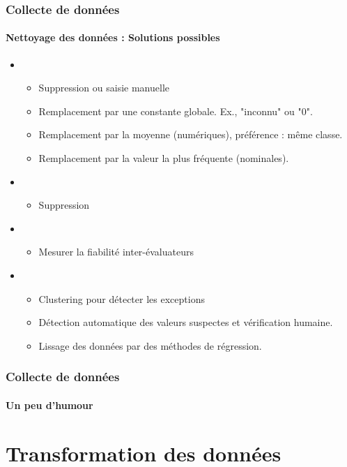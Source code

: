 \documentclass[xcolor=table]{beamer}
\begin{document}
\begin{frame}
	\frametitle{Collecte de données}
	\framesubtitle{Nettoyage des données : Solutions possibles}
	
	\begin{itemize}
		\item {}
		\begin{itemize}
			\item Suppression ou saisie manuelle
			\item Remplacement par une constante globale. Ex., "inconnu" ou "0".
			\item Remplacement par la moyenne (numériques), préférence : même classe.
			\item Remplacement par la valeur la plus fréquente (nominales).
		\end{itemize}
		\item {}
		\begin{itemize}
			\item Suppression
		\end{itemize}
		\item {}
		\begin{itemize}
			\item Mesurer la fiabilité inter-évaluateurs
		\end{itemize}
		\item {} 
		\begin{itemize}
			\item Clustering pour détecter les exceptions
			\item Détection automatique des valeurs suspectes et vérification humaine.
			\item Lissage des données par des méthodes de régression.
		\end{itemize}
	\end{itemize}
	
\end{frame}

\begin{frame}
	\frametitle{Collecte de données}
	\framesubtitle{Un peu d'humour}
	
	\begin{center}
	\end{center}
	
\end{frame}

\section{Transformation des données}
\end{document}
